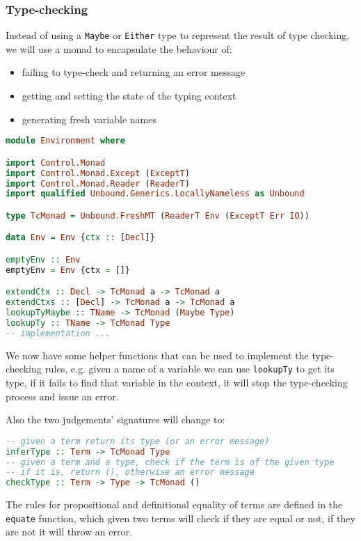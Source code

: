 \documentclass[12pt]{article}
\theoremstyle{definition}
\newcommand{\code}[1]{\texttt{#1}}
\begin{document}
\subsubsection{Type-checking}

Instead of using a \code{Maybe} or \code{Either} type to represent the result of type checking, we will use a monad to encapsulate the behaviour of:
\begin{itemize}
       \item failing to type-check and returning an error message
       \item getting and setting the state of the typing context
       \item generating fresh variable names
\end{itemize}

\begin{lstlisting}[language=Haskell]
module Environment where

import Control.Monad
import Control.Monad.Except (ExceptT)
import Control.Monad.Reader (ReaderT)
import qualified Unbound.Generics.LocallyNameless as Unbound

type TcMonad = Unbound.FreshMT (ReaderT Env (ExceptT Err IO))

data Env = Env {ctx :: [Decl]}

emptyEnv :: Env
emptyEnv = Env {ctx = []}

extendCtx :: Decl -> TcMonad a -> TcMonad a
extendCtxs :: [Decl] -> TcMonad a -> TcMonad a
lookupTyMaybe :: TName -> TcMonad (Maybe Type)
lookupTy :: TName -> TcMonad Type
-- implementation ...
\end{lstlisting}

We now have some helper functions that can be used to implement the type-checking rules, e.g. given a name of a variable we can use \code{lookupTy} to get its type, if it fails to find that variable in the context, it will stop the type-checking process and issue an error.

Also the two judgements' signatures will change to:

\begin{lstlisting}[language=Haskell]
-- given a term return its type (or an error message)
inferType :: Term -> TcMonad Type
-- given a term and a type, check if the term is of the given type
-- if it is, return (), otherwise an error message
checkType :: Term -> Type -> TcMonad ()
\end{lstlisting}

The rules for propositional and definitional equality of terms are defined in the \code{equate} function, which given two terms will check if they are equal or not, if they are not it will throw an error.
\end{document}

